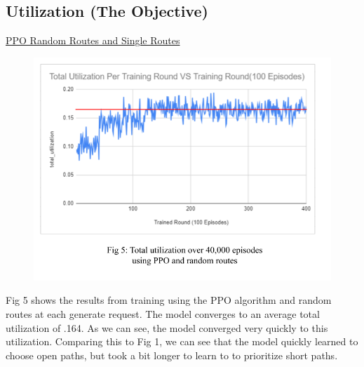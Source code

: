 \documentclass[conference]{IEEEtran}
\begin{document}

\subsection{Utilization (The Objective)}
\begin{flushleft}
\underline{PPO Random Routes and Single Routes}
\begin{figure}[ht!]
    \includegraphics[width=.75\linewidth]{Final Paper Results And Graphs (1).png}
\end{figure}
\newline \newline
Fig 5 shows the results from training using the PPO algorithm and random routes at each generate request. The model converges to an average total utilization of .164. As we can see, the model converged very quickly to this utilization. Comparing this to Fig 1, we can see that the model quickly learned to choose open paths, but took a bit longer to learn to to prioritize short paths. 
\newline \newline
\newline \newline
\newline \newline



\end{flushleft}
\end{document}
